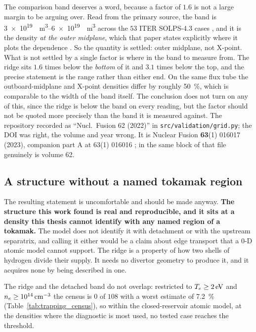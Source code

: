 The comparison band deserves a word, because a factor of $1.6$ is not a large
margin to be arguing over. Read from the primary source, the band is
\SIrange{3e19}{6e19}{\per\cubic\metre} across the $53$ ITER SOLPS-4.3 cases
\cite[Sec.~3.1.1]{Pitts2019}, and it is the density \emph{at the outer
midplane}, which that paper states explicitly where it plots the dependence
\cite[Sec.~3.2.2]{Pitts2019}. So the quantity is settled: outer midplane, not
X-point. What is not settled by a single factor is where in the band to
measure from. The ridge sits $1.6$ times below the \emph{bottom} of it and
$3.1$ times below the top, and the precise statement is the range rather than
either end. On the same flux tube the outboard-midplane and X-point densities
differ by roughly \SI{50}{\percent}, which is comparable to the width of the
band itself. The conclusion does not turn on any of this, since the ridge is
below the band on every reading, but the factor should not be quoted more
precisely than the band it is measured against.
The repository recorded \cite{Stangeby2023} as ``Nucl.\ Fusion 62 (2022)'' in
\texttt{src/validation/grid.py}; the DOI was right, the volume and year wrong.
It is Nuclear Fusion \textbf{63}(1) 016017 (2023), companion part A at 63(1)
016016 \cite{Stangeby2023a}; \cite{Lore2022} in the same block of that file
genuinely is volume 62.

\subsection{A structure without a named tokamak region}

The resulting statement is uncomfortable and should be made anyway. \textbf{The
structure this work found is real and reproducible, and it sits at a density
this thesis cannot identify with any named region of a tokamak.} The model does
not identify it with detachment or with the upstream separatrix, and calling it
either would be a claim about edge transport that a $0$-D atomic model cannot
support. The ridge
is a property of how two shells of hydrogen divide their supply. It needs no
divertor geometry to produce it, and it acquires none by being described in one.

The ridge and the detached band do not overlap: restricted to
$T_e \ge \SI{2}{\electronvolt}$ and $n_e \ge 10^{14}\,\si{\per\cubic\centi\metre}$
the census is $0$ of $108$ with a worst estimate of \SI{7.2}{\percent}
(Table~\ref{tab:trapping_census}), so within the closed-reservoir atomic model,
at the densities where the diagnostic is most used, no tested case reaches the
threshold.

